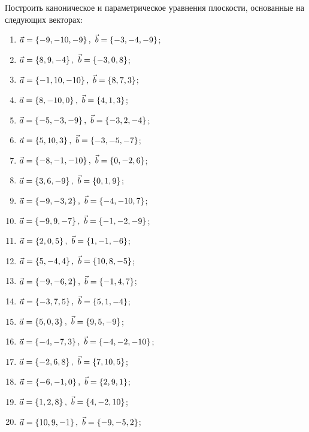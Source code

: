 	\vspace{15pt}
	Построить каноническое и параметрическое уравнения плоскости, основанные на следующих векторах:
	
	\begin{enumerate}
		\setcounter{enumi}{\value{tasks}}

			\item \( \displaystyle \va = \bracs{-9, -10, -9}, ~ \vb = \bracs{-3, -4, -9} \);
			\item \( \displaystyle \va = \bracs{8, 9, -4}, ~ \vb = \bracs{-3, 0, 8} \);
			\item \( \displaystyle \va = \bracs{-1, 10, -10}, ~ \vb = \bracs{8, 7, 3} \);
			\item \( \displaystyle \va = \bracs{8, -10, 0}, ~ \vb = \bracs{4, 1, 3} \);
			\item \( \displaystyle \va = \bracs{-5, -3, -9}, ~ \vb = \bracs{-3, 2, -4} \);
			\item \( \displaystyle \va = \bracs{5, 10, 3}, ~ \vb = \bracs{-3, -5, -7} \);
			\item \( \displaystyle \va = \bracs{-8, -1, -10}, ~ \vb = \bracs{0, -2, 6} \);
			\item \( \displaystyle \va = \bracs{3, 6, -9}, ~ \vb = \bracs{0, 1, 9} \);
			\item \( \displaystyle \va = \bracs{-9, -3, 2}, ~ \vb = \bracs{-4, -10, 7} \);
			\item \( \displaystyle \va = \bracs{-9, 9, -7}, ~ \vb = \bracs{-1, -2, -9} \);
			\item \( \displaystyle \va = \bracs{2, 0, 5}, ~ \vb = \bracs{1, -1, -6} \);
			\item \( \displaystyle \va = \bracs{5, -4, 4}, ~ \vb = \bracs{10, 8, -5} \);
			\item \( \displaystyle \va = \bracs{-9, -6, 2}, ~ \vb = \bracs{-1, 4, 7} \);
			\item \( \displaystyle \va = \bracs{-3, 7, 5}, ~ \vb = \bracs{5, 1, -4} \);
			\item \( \displaystyle \va = \bracs{5, 0, 3}, ~ \vb = \bracs{9, 5, -9} \);
			\item \( \displaystyle \va = \bracs{-4, -7, 3}, ~ \vb = \bracs{-4, -2, -10} \);
			\item \( \displaystyle \va = \bracs{-2, 6, 8}, ~ \vb = \bracs{7, 10, 5} \);
			\item \( \displaystyle \va = \bracs{-6, -1, 0}, ~ \vb = \bracs{2, 9, 1} \);
			\item \( \displaystyle \va = \bracs{1, 2, 8}, ~ \vb = \bracs{4, -2, 10} \);
			\item \( \displaystyle \va = \bracs{10, 9, -1}, ~ \vb = \bracs{-9, -5, 2} \);

		\setcounter{tasks}{\value{enumi}}
	\end{enumerate}


